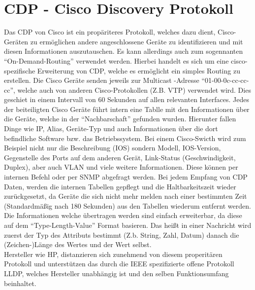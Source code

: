 \section{CDP - Cisco Discovery Protokoll}
\label{sec:cdp}

Das CDP von Cisco ist ein propäriteres Protokoll, welches dazu dient, Cisco-Geräten zu ermöglichen andere angeschlossene Geräte zu identifizieren und mit diesen Informationen auszutauschen. Es kann allerdings auch zum sogennanten “On-Demand-Routing” verwendet werden. Hierbei handelt es sich um eine cisco-spezifische Erweiterung von CDP, welche es ermöglicht ein simples Routing zu erstellen.
Die Cisco Geräte senden jeweils zur Multicast -Adresse “01-00-0c-cc-cc-cc”, welche auch von anderen Cisco-Protokollen (Z.B. VTP) verwendet wird. Dies geschiet in einem Intervall von 60 Sekunden auf allen relevanten Interfaces. Jedes der beiteiligten Cisco Geräte führt intern eine Tablle mit den Informationen über die Geräte, welche in der “Nachbarschaft” gefunden wurden. Hierunter fallen Dinge wie IP, Alias, Geräte-Typ und auch Informationen über die dort befindliche Software bzw. das Betriebssystem. Bei einem Cisco-Swicth wird zum Beispiel nicht nur die Beschreibung (IOS) sondern Modell, IOS-Version, Gegenstelle des Ports auf dem anderen Gerät, Link-Status (Geschwindigkeit, Duplex), aber auch VLAN und viele weitere Informationen. Diese können per internen Befehl oder per SNMP abgefragt werden. Bei jedem Empfang von CDP Daten, werden die internen Tabellen gepflegt und die Haltbarkeitszeit wieder zurückgesetzt, da Geräte die sich nicht mehr melden nach einer bestimmten Zeit (Standardmäßig nach 180 Sekunden) aus den Tabellen wiederum entfernt werden. Die Informationen welche übertragen werden sind einfach erweiterbar, da diese auf dem “Type-Length-Value” Format basieren. Das heißt in einer Nachricht wird zuerst der Typ des Attributs bestimmt (Z.b. String, Zahl, Datum) danach die (Zeichen-)Länge des Wertes und der Wert selbst.\\
Hersteller wie HP, distanzieren sich zunehmend von diesem properitären Protokoll und unterstützen das durch die IEEE spezifizierte offene Protokoll LLDP, welches Hersteller unabhängig ist und den selben Funktionsumfang beinhaltet.